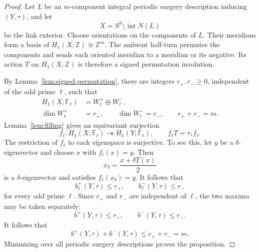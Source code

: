 \documentclass[10pt,a4paper]{amsart}
\newcommand{\F}{\mathbb{F}}
\newcommand{\Int}{\operatorname{int}}
\newcommand{\Z}{\mathbb{Z}}
\begin{document}
\begin{proof}
Let $L$ be an $m$-component integral periodic surgery description inducing $(Y,\tau)$, and let
\[
   X=S^3\setminus\Int N(L)
\]
be the link exterior. Choose orientations on the components of $L$. Their meridians form a basis of $H_1(X;\Z)\cong\Z^m$. The ambient half-turn permutes the components and sends each oriented meridian to a meridian or its negative. Its action $T$ on $H_1(X;\Z)$ is therefore a signed permutation involution.

By Lemma~\ref{lem:signed-permutation}, there are integers $r_+,r_-\geq0$, independent of the odd prime $\ell$, such that
\[
   \begin{aligned}
   H_1(X;\F_\ell)&=W^+_\ell\oplus W^-_\ell,\\
   \dim W^+_\ell&=r_+,
   \qquad
   \dim W^-_\ell=r_-,
   \qquad
   r_++r_-=m.
   \end{aligned}
\]
Lemma~\ref{lem:filling} gives an equivariant surjection
\[
   f_\ell\colon H_1(X;\F_\ell)\twoheadrightarrow H_1(Y;\F_\ell),
   \qquad
   f_\ell T=\tau_*f_\ell.
\]
The restriction of $f_\ell$ to each eigenspace is surjective. To see this, let $y$ be a $\delta$-eigenvector and choose $x$ with $f_\ell(x)=y$. Then
\[
   x_\delta=\frac{x+\delta T(x)}2
\]
is a $\delta$-eigenvector and satisfies $f_\ell(x_\delta)=y$. It follows that
\[
   b^+_\ell(Y,\tau)\leq r_+,
   \qquad
   b^-_\ell(Y,\tau)\leq r_-
\]
for every odd prime $\ell$. Since $r_+$ and $r_-$ are independent of $\ell$, the two maxima may be taken separately:
\[
   b^+(Y,\tau)\leq r_+,
   \qquad
   b^-(Y,\tau)\leq r_-.
\]
It follows that
\[
   b^+(Y,\tau)+b^-(Y,\tau)\leq r_++r_-=m.
\]
Minimizing over all periodic surgery descriptions proves the proposition.
\end{proof}
\end{document}
